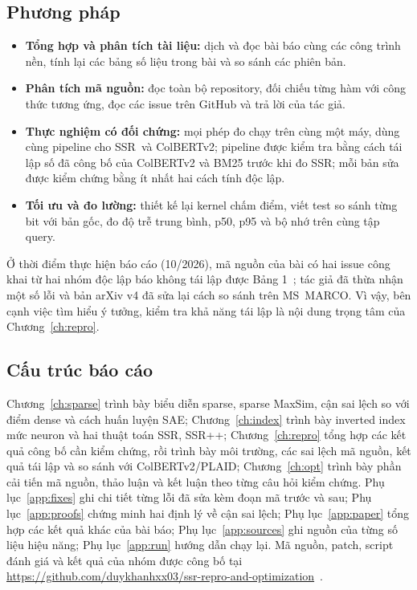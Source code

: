 \documentclass[a4paper,13pt]{extreport}
\newcommand{\RepoNhom}{https://github.com/duykhanhxx03/ssr-repro-and-optimization}
\theoremstyle{plain}
\newcommand{\ssr}{SSR}
\newcommand{\ssrpp}{SSR++}
\begin{document}
\subsection{Phương pháp}
\begin{itemize}[leftmargin=1.5cm]
  \item \textbf{Tổng hợp và phân tích tài liệu:} dịch và đọc bài báo cùng các công trình nền, tính lại các bảng số liệu trong bài và so sánh các phiên bản.
  \item \textbf{Phân tích mã nguồn:} đọc toàn bộ repository, đối chiếu từng hàm với công thức tương ứng, đọc các issue trên GitHub và trả lời của tác giả.
  \item \textbf{Thực nghiệm có đối chứng:} mọi phép đo chạy trên cùng một máy, dùng cùng pipeline cho \ssr\ và ColBERTv2; pipeline được kiểm tra bằng cách tái lập số đã công bố của ColBERTv2 và BM25 trước khi đo \ssr; mỗi bản sửa được kiểm chứng bằng ít nhất hai cách tính độc lập.
  \item \textbf{Tối ưu và đo lường:} thiết kế lại kernel chấm điểm, viết test so sánh từng bit với bản gốc, đo độ trễ trung bình, p50, p95 và bộ nhớ trên cùng tập query.
\end{itemize}
Ở thời điểm thực hiện báo cáo (10/2026), mã nguồn của bài có hai issue công khai từ hai nhóm độc lập báo không tái lập được Bảng 1~\cite{ssrcode}; tác giả đã thừa nhận một số lỗi và bản arXiv v4 đã sửa lại cách so sánh trên MS~MARCO. Vì vậy, bên cạnh việc tìm hiểu ý tưởng, kiểm tra khả năng tái lập là nội dung trọng tâm của Chương~\ref{ch:repro}.

\subsection{Cấu trúc báo cáo}
Chương~\ref{ch:sparse} trình bày biểu diễn sparse, sparse MaxSim, cận sai lệch so với điểm dense và cách huấn luyện SAE; Chương~\ref{ch:index} trình bày inverted index mức neuron và hai thuật toán \ssr, \ssrpp; Chương~\ref{ch:repro} tổng hợp các kết quả công bố cần kiểm chứng, rồi trình bày môi trường, các sai lệch mã nguồn, kết quả tái lập và so sánh với ColBERTv2/PLAID; Chương~\ref{ch:opt} trình bày phần cải tiến mã nguồn, thảo luận và kết luận theo từng câu hỏi kiểm chứng. Phụ lục~\ref{app:fixes} ghi chi tiết từng lỗi đã sửa kèm đoạn mã trước và sau; Phụ lục~\ref{app:proofs} chứng minh hai định lý về cận sai lệch; Phụ lục~\ref{app:paper} tổng hợp các kết quả khác của bài báo; Phụ lục~\ref{app:sources} ghi nguồn của từng số liệu hiệu năng; Phụ lục~\ref{app:run} hướng dẫn chạy lại. Mã nguồn, patch, script đánh giá và kết quả của nhóm được công bố tại \url{\RepoNhom}~\cite{nhom}.
\end{document}
